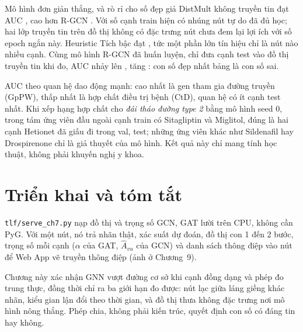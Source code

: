 \begin{phathien}{Mô hình đơn giản thắng, và rò rỉ cho số đẹp giả}
DistMult không truyền tin đạt AUC , cao hơn R-GCN . Với số cạnh train hiện có
nhúng nút tự do đã đủ học; hai lớp truyền tin trên đồ thị không có đặc trưng nút chưa đem lại lợi ích với số epoch
ngắn này. Heuristic Tích bậc đạt , tức một phần lớn tín hiệu chỉ là nút nào nhiều cạnh. Cùng mô hình R-GCN đã huấn
luyện, chỉ đưa cạnh test vào đồ thị truyền tin khi đo, AUC nhảy lên , tăng : con
số đẹp nhất bảng là con số sai.
\end{phathien}

AUC theo quan hệ dao động mạnh: cao nhất là gen tham gia đường truyền (GpPW), thấp nhất là hợp chất điều trị bệnh (CtD), quan hệ có
ít cạnh test nhất. Khi xếp hạng hợp chất cho \emph{đái tháo đường type 2} bằng mô hình seed 0, trong tám ứng viên đầu ngoài cạnh
train có Sitagliptin và Miglitol, đúng là hai cạnh Hetionet đã giấu đi trong val, test; những ứng viên khác như Sildenafil
hay Drospirenone chỉ là giả thuyết của mô hình. Kết quả này chỉ mang tính học thuật, không phải khuyến nghị y khoa.

\section{Triển khai và tóm tắt}

\texttt{tlf/serve\_ch7.py} nạp đồ thị và trọng số GCN, GAT lười trên CPU, không cần PyG. Với một nút, nó trả nhãn thật, xác suất dự đoán,
đồ thị con 1 đến 2 bước, trọng số mỗi cạnh ($\alpha$ của GAT, $\hat A_{vu}$ của GCN) và danh sách thông điệp vào nút để Web App vẽ
truyền thông điệp (ảnh ở Chương~9).

Chương này xác nhận GNN vượt đường cơ sở khi cạnh đồng dạng và phép đo trung thực, đồng thời chỉ ra ba giới hạn đo được: nút lạc giữa
láng giềng khác nhãn, kiểu gian lận đổi theo thời gian, và đồ thị thưa không đặc trưng nơi mô hình nông thắng. Phép chia, không phải
kiến trúc, quyết định con số có đáng tin hay không.
